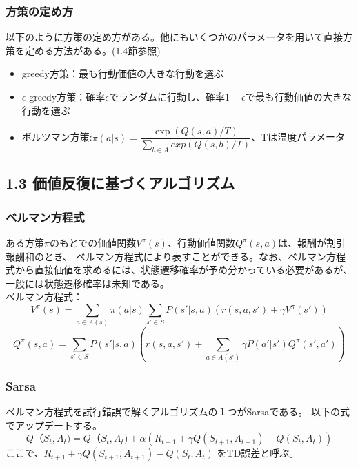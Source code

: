 \documentclass[]{jarticle}
\begin{document}
\subsubsection*{方策の定め方}
以下のように方策の定め方がある。他にもいくつかのパラメータを用いて直接方策を定める方法がある。(1.4節参照)
\begin{itemize}
	\item greedy方策：最も行動価値の大きな行動を選ぶ
	\item $\epsilon$-greedy方策：確率$\epsilon$でランダムに行動し、確率$1-\epsilon$で最も行動価値の大きな行動を選ぶ
	\item ボルツマン方策:$\pi(a|s)=\dfrac{\exp(Q(s,a)/T)}{\sum_{b\in{A}}exp(Q(s,b)/T)}$、Tは温度パラメータ
\end{itemize}
	

\subsection*{1.3 価値反復に基づくアルゴリズム}

\subsubsection*{ベルマン方程式}
ある方策$\pi$のもとでの価値関数$V^\pi(s)$、行動価値関数$Q^{\pi}(s,a)$は、報酬が割引報酬和のとき、
ベルマン方程式により表すことができる。なお、ベルマン方程式から直接価値を求めるには、状態遷移確率が予め分かっている必要があるが、一般には状態遷移確率は未知である。\\
ベルマン方程式：
\begin{equation*}
V^{\pi}(s) = \sum_{a\in{A(s)}} \pi(a|s)  \sum_{s' \in{S}} P(s' |s, a) (r(s,a,s') + \gamma V^{\pi}(s')) 
\end{equation*}
\begin{equation*}
Q^{\pi}(s,a) = \sum_{s'\in{S}} P(s' |s, a) (r(s,a,s') + \sum_{a \in{A(s')}} \gamma P(a'|s')  Q^{\pi}(s',a'))
\end{equation*}

\subsubsection*{Sarsa}
ベルマン方程式を試行錯誤で解くアルゴリズムの１つがSarsaである。
以下の式でアップデートする。
\begin{equation*}
Q（S_t, A_t) = Q（S_t, A_t) + \alpha (R_{t+1} + \gamma Q(S_{t+1},A_{t+1}) - Q(S_t, A_t))
\end{equation*}
ここで、$R_{t+1} + \gamma Q(S_{t+1},A_{t+1}) - Q(S_t, A_t)$ をTD誤差と呼ぶ。
\\
\end{document}
